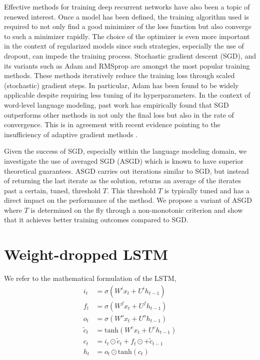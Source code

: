 \documentclass{article}
\begin{document}
Effective methods for training deep recurrent networks have also been a topic of renewed interest. Once a model has been defined, the training algorithm used is required to not only find a good minimizer of the loss function but also converge to such a minimizer rapidly. The choice of the optimizer is even more important in the context of regularized models since such strategies, especially the use of dropout, can impede the training process. Stochastic gradient descent (SGD), and its variants such as Adam \cite{kingma2014adam} and RMSprop \cite{tieleman2012lecture} are amongst the most popular training methods. These methods iteratively reduce the training loss through scaled (stochastic) gradient steps. In particular, Adam has been found to be widely applicable despite requiring less tuning of its hyperparameters. In the context of word-level language modeling, past work has empirically found that SGD outperforms other methods in not only the final loss but also in the rate of convergence. This is in agreement with recent evidence pointing to the insufficiency of adaptive gradient methods \cite{wilson2017marginal}.

Given the success of SGD, especially within the language modeling domain, we investigate the use of averaged SGD (ASGD)  \cite{polyak1992acceleration} which is known to have superior theoretical guarantees.
ASGD carries out iterations similar to SGD, but instead of returning the last iterate as the solution, returns an average of the iterates past a certain, tuned, threshold $T$.
This threshold $T$ is typically tuned and has a direct impact on the performance of the method.
We propose a variant of ASGD where $T$ is determined on the fly through a non-monotonic criterion and show that it achieves better training outcomes compared to SGD.

\section{Weight-dropped LSTM}

We refer to the mathematical formulation of the LSTM,
\begin{align*}
i_t &= \sigma(W^i x_t + U^i h_{t-1}) \\
f_t &= \sigma(W^f x_t + U^f h_{t-1}) \\
o_t &= \sigma(W^o x_t + U^o h_{t-1}) \\
\tilde{c}_t &= \text{tanh}(W^c x_t + U^c h_{t-1}) \\
c_t &= i_t \odot \tilde{c}_t + f_t \odot + \tilde{c}_{t-1} \\
h_t &= o_t \odot \text{tanh}(c_t)
\end{align*}
\end{document}
